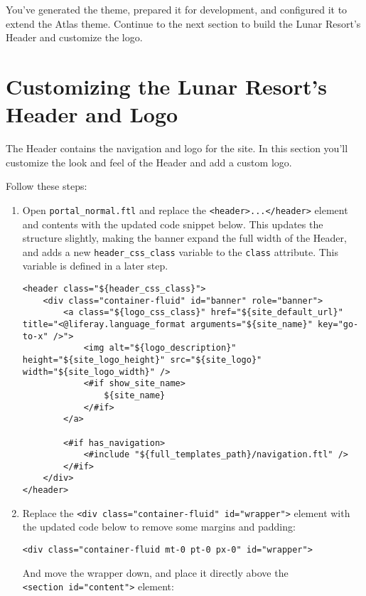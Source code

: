 You've generated the theme, prepared it for development, and configured
it to extend the Atlas theme. Continue to the next section to build the
Lunar Resort's Header and customize the logo.

\chapter{Customizing the Lunar Resort's Header and
Logo}\label{customizing-the-lunar-resorts-header-and-logo}

The Header contains the navigation and logo for the site. In this
section you'll customize the look and feel of the Header and add a
custom logo.

Follow these steps:

\begin{enumerate}
\def\labelenumi{\arabic{enumi}.}
\item
  Open \texttt{portal\_normal.ftl} and replace the
  \texttt{\textless{}header\textgreater{}...\textless{}/header\textgreater{}}
  element and contents with the updated code snippet below. This updates
  the structure slightly, making the banner expand the full width of the
  Header, and adds a new \texttt{header\_css\_class} variable to the
  \texttt{class} attribute. This variable is defined in a later step.

\begin{verbatim}
<header class="${header_css_class}">
    <div class="container-fluid" id="banner" role="banner">
        <a class="${logo_css_class}" href="${site_default_url}" title="<@liferay.language_format arguments="${site_name}" key="go-to-x" />">
            <img alt="${logo_description}" height="${site_logo_height}" src="${site_logo}" width="${site_logo_width}" />
            <#if show_site_name>
                ${site_name}
            </#if>
        </a>

        <#if has_navigation>
            <#include "${full_templates_path}/navigation.ftl" />
        </#if>
    </div>
</header>
\end{verbatim}
\item
  Replace the
  \texttt{\textless{}div\ class="container-fluid"\ id="wrapper"\textgreater{}}
  element with the updated code below to remove some margins and
  padding:

\begin{verbatim}
<div class="container-fluid mt-0 pt-0 px-0" id="wrapper">
\end{verbatim}

  And move the wrapper down, and place it directly above the
  \texttt{\textless{}section\ id="content"\textgreater{}} element:


\end{enumerate}
